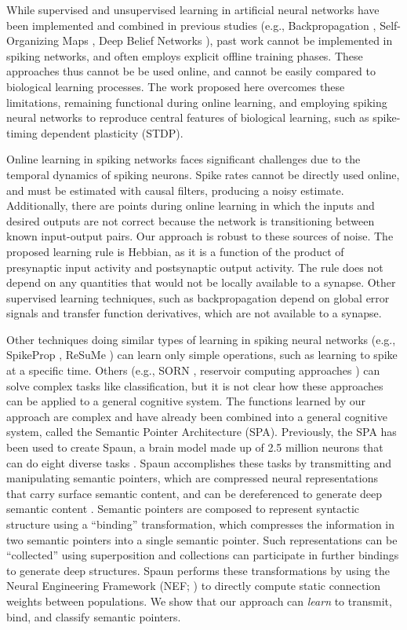\documentclass[10pt,letterpaper]{article}
\begin{document}
While supervised and unsupervised learning
in artificial neural networks have been
implemented and combined in previous studies
(e.g., Backpropagation \cite{Rumelhart1986},
Self-Organizing Maps \cite{Kohonen1982},
Deep Belief Networks \cite{Hinton2006}),
past work cannot be implemented in spiking networks,
and often employs explicit offline training phases.
These approaches thus cannot be be used online,
and cannot be easily compared to biological learning processes.
The work proposed here overcomes these limitations,
remaining functional during online learning,
and employing spiking neural networks
to reproduce central features of biological learning,
such as spike-timing dependent plasticity (STDP).

Online learning in spiking networks
faces significant challenges
due to the temporal dynamics of spiking neurons.
Spike rates cannot be directly used online,
and must be estimated with causal filters,
producing a noisy estimate.
Additionally, there are points during online learning
in which the inputs and desired outputs
are not correct because the network
is transitioning between known input-output pairs.
Our approach is robust to these sources of noise.
The proposed learning rule is Hebbian,
as it is a function of the product of
presynaptic input activity and postsynaptic output activity.
The rule does not depend on any quantities that
would not be locally available
to a synapse.
Other supervised learning techniques,
such as backpropagation \cite{Rumelhart1986}
depend on global error signals
and transfer function derivatives,
which are not available to a synapse.

Other techniques doing similar types of learning
in spiking neural networks
(e.g., SpikeProp \cite{Bohte2002}, ReSuMe \cite{Ponulak2006a})
can learn only simple operations,
such as learning to spike at a specific time.
Others (e.g., SORN \cite{Lazar2009}, reservoir computing approaches
\cite{Paugam2008}) can solve complex tasks like classification,
but it is not clear how these approaches can be applied
to a general cognitive system.
The functions learned by our approach are
complex and have already been combined into
a general cognitive system, called the
Semantic Pointer Architecture (SPA).
Previously, the SPA has been used to create Spaun,
a brain model made up of 2.5 million neurons
that can do eight diverse tasks \cite{Eliasmith2012}.
Spaun accomplishes these tasks by
transmitting and manipulating semantic pointers,
which are compressed neural representations
that carry surface semantic content,
and can be dereferenced to generate
deep semantic content \cite{EliasmithInPress}.
Semantic pointers are composed to represent syntactic structure
using a ``binding'' transformation,
which compresses the information in two semantic pointers
into a single semantic pointer.
Such representations can be ``collected''
using superposition and collections
can participate in further bindings to generate deep structures.
Spaun performs these transformations by using
the Neural Engineering Framework (NEF; )
to directly compute static connection weights between populations.
We show that our approach can \textit{learn} to transmit, bind,
and classify semantic pointers.
\end{document}
